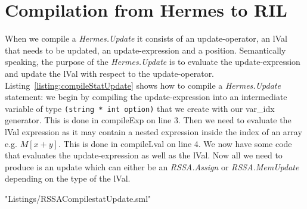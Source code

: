 \section{Compilation from Hermes to RIL}
When we compile a \emph{Hermes.Update} it consists of an update-operator, an lVal that needs to be updated, an update-expression and a position.
Semantically speaking, the purpose of the \emph{Hermes.Update} is to evaluate the update-expression and update the lVal with respect to the update-operator.
Listing~\ref{listing:compileStatUpdate} shows how to compile a \emph{Hermes.Update} statement: we begin by compiling the update-expression into an intermediate variable of type \lstinline{(string * int option)} that we create with our var\_idx generator. This is done in compileExp on line 3. Then we need to evaluate the lVal expression as it may contain a nested expression inside the index of an array e.g. $M[x+y]$. This is done in compileLval on line 4.
We now have some code that evaluates the update-expression as well as the lVal.
Now all we need to produce is an update which can either be an \emph{RSSA.Assign} or \emph{RSSA.MemUpdate} depending on the type of the lVal.

 {"Listings/RSSACompilestatUpdate.sml"}

